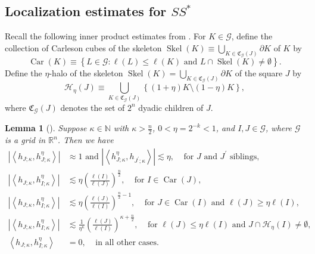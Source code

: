 \documentclass{amsart}%
\theoremstyle{plain}
\newtheorem{lemma}[theorem]{Lemma}
\numberwithin{equation}{section}
\begin{document}
\subsection{Localization estimates for $SS^{\ast}$}

Recall the following inner product estimates from \cite[Lemma 19]{Saw7}. For
$K\in\mathcal{G}$, define the collection of Carleson cubes of the skeleton
$\operatorname*{Skel}\left(  K\right)  \equiv\bigcup_{K\in\mathfrak{C}%
_{\mathcal{G}}\left(  J\right)  }\partial K$ of $K$ by%
\[
\operatorname*{Car}\left(  K\right)  \equiv\left\{  L\in\mathcal{G}%
:\ell\left(  L\right)  \leq\ell\left(  K\right)  \text{ and }L\cap
\operatorname*{Skel}\left(  K\right)  \neq\emptyset\right\}  .
\]
Define the $\eta$-halo of the skeleton $\operatorname*{Skel}\left(  K\right)
=\bigcup_{K\in\mathfrak{C}_{\mathcal{G}}\left(  J\right)  }\partial K$ of the
square $J$ by
\[
\mathcal{H}_{\eta}\left(  J\right)  \equiv\bigcup_{K\in\mathfrak{C}%
_{\mathcal{G}}\left(  J\right)  }\left\{  \left(  1+\eta\right)
K\setminus\left(  1-\eta\right)  K\right\}  ,
\]
where $\mathfrak{C}_{\mathcal{G}}\left(  J\right)  $ denotes the set of
$2^{n}$ dyadic children of $J$.

\begin{lemma}
[{\cite[Lemma 19]{Saw7}}]\label{inner est}Suppose $\kappa\in\mathbb{N}$ with
$\kappa>\frac{n}{2}$, $0<\eta=2^{-k}<1$, and $I,J\in\mathcal{G}$, where
$\mathcal{G}$ is a grid in $\mathbb{R}^{n}$. Then we have%
\begin{align*}
\left\vert \left\langle h_{J;\kappa},h_{J;\kappa}^{\eta}\right\rangle
\right\vert  & \approx1\text{ and }\left\vert \left\langle h_{J;\kappa}^{\eta
},h_{J^{\prime};\kappa}\right\rangle \right\vert \lesssim\eta
,\ \ \ \ \ \text{for }J\text{ and }J^{\prime}\text{ siblings},\\
\left\vert \left\langle h_{J;\kappa},h_{I;\kappa}^{\eta}\right\rangle
\right\vert  & \lesssim\eta\left(  \frac{\ell\left(  I\right)  }{\ell\left(
J\right)  }\right)  ^{\frac{n}{2}},\ \ \ \ \ \text{for }I\in
\operatorname*{Car}\left(  J\right)  ,\\
\left\vert \left\langle h_{J;\kappa},h_{I;\kappa}^{\eta}\right\rangle
\right\vert  & \lesssim\eta\left(  \frac{\ell\left(  J\right)  }{\ell\left(
I\right)  }\right)  ^{\frac{n}{2}-1},\ \ \ \ \ \text{for }J\in
\operatorname*{Car}\left(  I\right)  \text{ and }\ell\left(  J\right)
\geq\eta\ell\left(  I\right)  ,\\
\left\vert \left\langle h_{J;\kappa},h_{I;\kappa}^{\eta}\right\rangle
\right\vert  & \lesssim\frac{1}{\eta^{\kappa}}\left(  \frac{\ell\left(
J\right)  }{\ell\left(  I\right)  }\right)  ^{\kappa+\frac{n}{2}%
},\ \ \ \ \ \text{for }\ell\left(  J\right)  \leq\eta\ell\left(  I\right)
\text{ and }J\cap\mathcal{H}_{\eta}\left(  I\right)  \neq\emptyset,\\
\left\langle h_{J;\kappa},h_{I;\kappa}^{\eta}\right\rangle  &
=0,\ \ \ \ \ \text{in all other cases}.
\end{align*}

\end{lemma}
\end{document}
